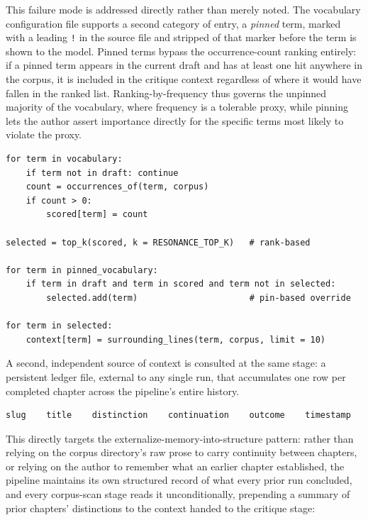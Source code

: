 \documentclass[11pt]{article}
\theoremstyle{definition}
\begin{document}
This failure mode is addressed directly rather than merely noted. The
vocabulary configuration file supports a second category of entry, a
\emph{pinned} term, marked with a leading \texttt{!} in the source file
and stripped of that marker before the term is shown to the model.
Pinned terms bypass the occurrence-count ranking entirely: if a pinned
term appears in the current draft and has at least one hit anywhere in
the corpus, it is included in the critique context regardless of where
it would have fallen in the ranked list. Ranking-by-frequency thus
governs the unpinned majority of the vocabulary, where frequency is a
tolerable proxy, while pinning lets the author assert importance
directly for the specific terms most likely to violate the proxy.

\begin{lstlisting}[caption={Resonance ranking with pinning override}]
for term in vocabulary:
    if term not in draft: continue
    count = occurrences_of(term, corpus)
    if count > 0:
        scored[term] = count

selected = top_k(scored, k = RESONANCE_TOP_K)   # rank-based

for term in pinned_vocabulary:
    if term in draft and term in scored and term not in selected:
        selected.add(term)                      # pin-based override

for term in selected:
    context[term] = surrounding_lines(term, corpus, limit = 10)
\end{lstlisting}

A second, independent source of context is consulted at the same
stage: a persistent ledger file, external to any single run, that
accumulates one row per completed chapter across the pipeline's entire
history.

\begin{lstlisting}[caption={Ledger schema (tab-separated)}]
slug    title    distinction    continuation    outcome    timestamp
\end{lstlisting}

This directly targets the externalize-memory-into-structure pattern:
rather than relying on the corpus directory's raw prose to carry
continuity between chapters, or relying on the author to remember what
an earlier chapter established, the pipeline maintains its own
structured record of what every prior run concluded, and every
corpus-scan stage reads it unconditionally, prepending a summary of
prior chapters' distinctions to the context handed to the critique
stage:
\end{document}
